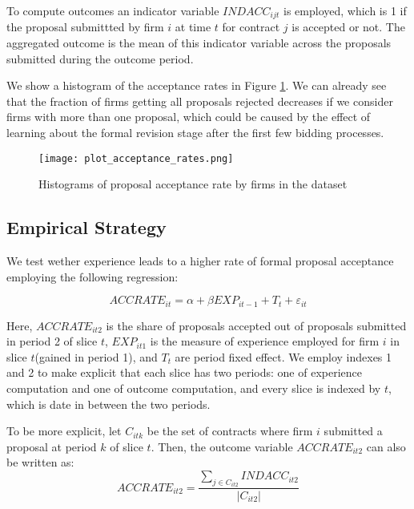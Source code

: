 To compute outcomes an indicator variable $INDACC_{ijt}$ is employed, which is 1 if the proposal submittted by firm $i$ at time $t$ for contract $j$ is accepted or not. The aggregated outcome is the mean of this indicator variable across the proposals submitted during the outcome period.

We show a histogram of the acceptance rates in Figure \ref{fig:plot_acceptance_rates}. We can already see that the fraction of firms getting all proposals rejected decreases if we consider firms with more than one proposal, which could be caused by the effect of learning about the formal revision stage after the first few bidding processes.

\begin{figure}
  \texttt{[image: plot\_acceptance\_rates.png]}
  \caption{Histograms of proposal acceptance rate by firms in the dataset}
  \label{fig:plot_acceptance_rates}
\end{figure}

\subsection{Empirical Strategy}
We test wether experience leads to a higher rate of formal proposal acceptance employing the following regression:

\begin{equation}
\label{eqn:olsspec}
ACCRATE_{it}=\alpha+ \beta EXP_{it-1}+T_t+\varepsilon_{it}
\end{equation}

Here, $ACCRATE_{it2}$ is the share of proposals accepted out of proposals submitted in period 2 of slice $t$, $EXP_{it1} $ is the measure of experience employed for firm $i$ in slice $t$(gained in period 1), and $T_t$ are period fixed effect. We employ indexes 1 and 2 to make explicit that each slice has two periods: one of experience computation and one of outcome computation, and every slice is indexed by $t$, which is date in between the two periods.

To be more explicit, let $C_{itk}$ be the set of contracts where firm $i$ submitted a proposal at period $k$ of slice $t$. Then, the outcome variable $ACCRATE_{it2}$ can also be written as:
$$  ACCRATE_{it2}=\dfrac{\sum_{j\in C_{it2}}INDACC_{it2}}{|C_{it2}|}$$


